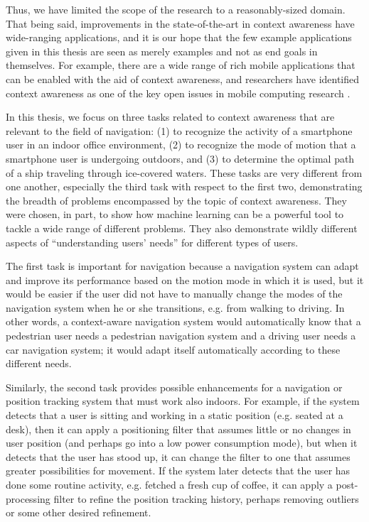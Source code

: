 Thus, we have limited the scope of the research to a reasonably-sized domain. That being said, improvements in the state-of-the-art in context awareness have wide-ranging applications, and it is our hope that the few example applications given in this thesis are seen as merely examples and not as end goals in themselves. For example, there are a wide range of rich mobile applications that can be enabled with the aid of context awareness, and researchers have identified context awareness as one of the key open issues in mobile computing research \cite{abolfazli2014rich}.

In this thesis, we focus on three tasks related to context awareness that are relevant to the field of navigation: (1) to recognize the activity of a smartphone user in an indoor office environment, (2) to recognize the mode of motion that a smartphone user is undergoing outdoors, and (3) to determine the optimal path of a ship traveling through ice-covered waters. These tasks are very different from one another, especially the third task with respect to the first two, demonstrating the breadth of problems encompassed by the topic of context awareness. They were chosen, in part, to show how machine learning can be a powerful tool to tackle a wide range of different problems. They also demonstrate wildly different aspects of ``understanding users' needs'' for different types of users.

The first task is important for navigation because a navigation system can adapt and improve its performance based on the motion mode in which it is used, but it would be easier if the user did not have to manually change the modes of the navigation system when he or she transitions, e.g. from walking to driving. In other words, a context-aware navigation system would automatically know that a pedestrian user needs a pedestrian navigation system and a driving user needs a car navigation system; it would adapt itself automatically according to these different needs.

Similarly, the second task provides possible enhancements for a navigation or position tracking system that must work also indoors. For example, if the system detects that a user is sitting and working in a static position (e.g. seated at a desk), then it can apply a positioning filter that assumes little or no changes in user position (and perhaps go into a low power consumption mode), but when it detects that the user has stood up, it can change the filter to one that assumes greater possibilities for movement. If the system later detects that the user has done some routine activity, e.g. fetched a fresh cup of coffee, it can apply a post-processing filter to refine the position tracking history, perhaps removing outliers or some other desired refinement.

